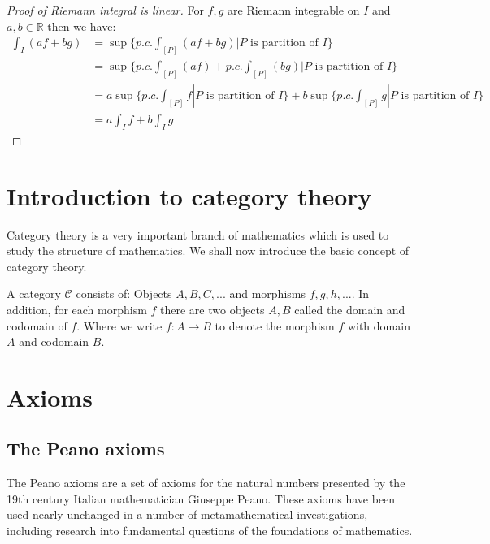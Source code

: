 \documentclass{article}
\newcommand{\R}{\mathbb{R}}
\begin{document}
\begin{proof}[Proof of Riemann integral is linear]
  For $f,g$ are Riemann integrable on $I$ and $a,b\in \R$ then we have:
  \begin{equation*}
    \begin{aligned}
      \int_{I}(af+bg) &= \sup\{p.c.\int_{[P]}(af+bg)|P \text{ is partition of } I\}\\
      &= \sup\{p.c.\int_{[P]}(af)+p.c.\int_{[P]}(bg)|P \text{ is partition of } I\}\\
      &= a\sup\{p.c.\int_{[P]}f|P \text{ is partition of } I\}+b\sup\{p.c.\int_{[P]}g|P \text{ is partition of } I\}\\
      &= a\int_{I}f+b\int_{I}g
    \end{aligned}
  \end{equation*}
\end{proof}





\section{Introduction to category theory}
Category theory is a very important branch of mathematics which is used to study the structure of mathematics.
We shall now introduce the basic concept of category theory.

\begin{definition}[Category]
A category $\mathcal{C}$ consists of: Objects $A,B,C,...$ and morphisms $f,g,h,...$.
In addition, for each morphism $f$ there are two objects $A,B$ called the domain and codomain of $f$.
Where we write $f:A\to B$ to denote the morphism $f$ with domain $A$ and codomain $B$.
\end{definition}





\section*{Axioms}

\subsection{The Peano axioms}
The Peano axioms are a set of axioms for the natural numbers presented by the 19th century Italian mathematician Giuseppe Peano.
These axioms have been used nearly unchanged in a number of metamathematical investigations, including research into fundamental questions of the foundations of mathematics.
\end{document}
